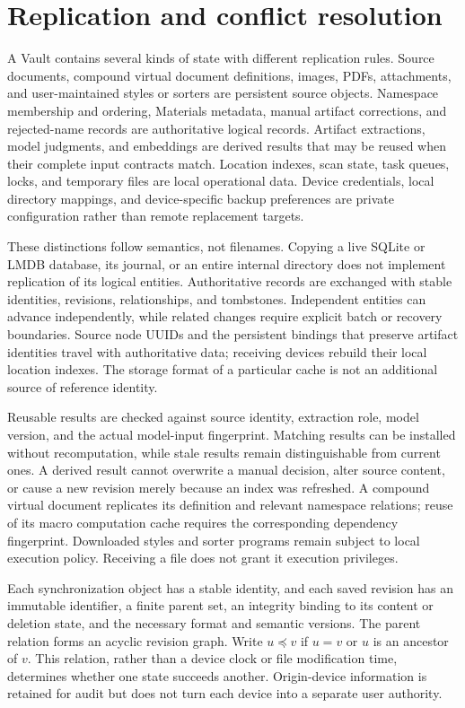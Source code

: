 \documentclass[11pt,a4paper]{article}
\theoremstyle{definition}
\theoremstyle{plain}
\begin{document}
\section{Replication and conflict resolution}
\label{sec:replication}

A Vault contains several kinds of state with different replication
rules. Source documents, compound virtual document definitions, images,
PDFs, attachments, and user-maintained styles or sorters are persistent
source objects. Namespace membership and ordering, Materials metadata,
manual artifact corrections, and rejected-name records are authoritative
logical records. Artifact extractions, model judgments, and embeddings
are derived results that may be reused when their complete input
contracts match. Location indexes, scan state, task queues, locks, and
temporary files are local operational data. Device credentials, local
directory mappings, and device-specific backup preferences are private
configuration rather than remote replacement targets.

These distinctions follow semantics, not filenames. Copying a live
SQLite or LMDB database, its journal, or an entire internal directory
does not implement replication of its logical entities. Authoritative
records are exchanged with stable identities, revisions, relationships,
and tombstones. Independent entities can advance independently, while
related changes require explicit batch or recovery boundaries. Source
node UUIDs and the persistent bindings that preserve artifact identities
travel with authoritative data; receiving devices rebuild their local
location indexes. The storage format of a particular cache is not an
additional source of reference identity.

Reusable results are checked against source identity, extraction role,
model version, and the actual model-input fingerprint. Matching results
can be installed without recomputation, while stale results remain
distinguishable from current ones. A derived result cannot overwrite a
manual decision, alter source content, or cause a new revision merely
because an index was refreshed. A compound virtual document replicates
its definition and relevant namespace relations; reuse of its macro
computation cache requires the corresponding dependency fingerprint.
Downloaded styles and sorter programs remain subject to local execution
policy. Receiving a file does not grant it execution privileges.

Each synchronization object has a stable identity, and each saved
revision has an immutable identifier, a finite parent set, an integrity
binding to its content or deletion state, and the necessary format and
semantic versions. The parent relation forms an acyclic revision graph.
Write $u\preceq v$ if $u=v$ or $u$ is an ancestor of $v$. This relation,
rather than a device clock or file modification time, determines whether
one state succeeds another. Origin-device information is retained for
audit but does not turn each device into a separate user authority.
\end{document}
